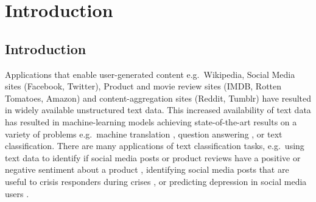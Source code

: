 \chapter{Introduction}\label{ch1}





\section{Introduction}



Applications that enable user-generated content e.g.\ Wikipedia, Social Media sites (Facebook, Twitter), Product and movie review sites (IMDB, Rotten Tomatoes, Amazon) and content-aggregation sites (Reddit, Tumblr) have resulted in widely available unstructured text data. This increased availability of text data has resulted in machine-learning models achieving state-of-the-art results on  a variety of problems e.g.\ machine translation \cite{Wu}, question answering \cite{Fisch2016}, or text classification. There are many applications of text classification tasks, e.g.\  using text data to identify if social media posts or product reviews have a positive or negative sentiment about a product \cite{Burel2018},  identifying social media posts  that are useful to crisis responders during crises \cite{Burel2018}, or  predicting depression in social media users \cite{Aldarwish2017}. 


